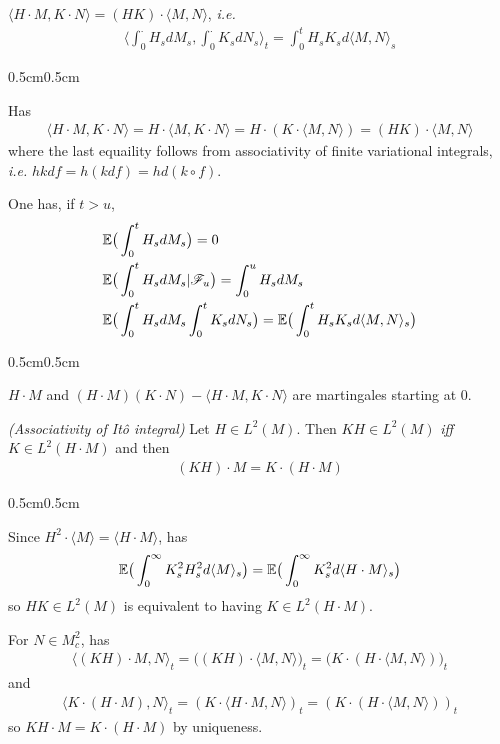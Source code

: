 \documentclass[12pt,a4paper]{article}
\newenvironment{proof}
{\begin{changemargin}{0.5cm}{0.5cm} 
	}%
	{\end{changemargin}
}
\newenvironment{p}
{\begin{proof} 
	}%
	{\end{proof}
}
\begin{document}
\corr $\langle H\cdot M, K\cdot N \rangle = (HK)\cdot \langle M, N \rangle$, \textit{i.e.}
\begin{align*}
\langle \int_0^{\cdot} H_s dM_s , \int_0^{\cdot} K_s dN_s \rangle_t = \int_0^t H_s K_s d\langle M, N \rangle_s 
\end{align*}
\begin{p}
\pf Has
\begin{align*}
\langle H\cdot M, K\cdot N \rangle = H \cdot \langle M, K \cdot N \rangle = H \cdot (K \cdot \langle M, N \rangle) = (HK) \cdot \langle M, N \rangle 
\end{align*}
where the last equaility follows from associativity of finite variational integrals, \textit{i.e.} $hk df = h(kdf) = h d(k \circ f)$.

\eop
\end{p}
\s

\corr One has, if $t>u$,
\begin{align*}
& \mathbb{E} \big( \int_0^t H_s dM_s \big) =0 \\
& \mathbb{E} \big( \int_0^t H_s dM_s | \mathscr{F}_u \big) = \int_0^u H_s dM_s \\
& \mathbb{E} \big( \int_0^t H_s dM_s \int_0^t K_s dN_s \big) = \mathbb{E} \big( \int_0^t H_s K_s d\langle M, N \rangle_s \big)
\end{align*} 
\begin{p}
\pf $H\cdot M$ and $(H\cdot M)(K \cdot N) - \langle H\cdot M, K \cdot N \rangle$ are martingales starting at 0.

\eop
\end{p}
\s

\corr \emph{(Associativity of It\^o integral)} Let $H\in L^2(M)$. Then $KH \in L^2(M)$ \emph{iff} $K \in L^2(H \cdot M)$ and then
\begin{align*}
(KH)\cdot M = K\cdot (H \cdot M)
\end{align*}
\begin{p}
\pf Since $H^2 \cdot \langle M \rangle = \langle H \cdot M \rangle$, has
\begin{align*}
\mathbb{E} \big( \int_0^{\infty} K_s^2 H_s^2 d\langle M \rangle_s \big) = \mathbb{E} \big( \int_0^{\infty} K_s^2 d\langle H \cdot M \rangle_s \big)
\end{align*}
so $HK \in L^2(M)$ is equivalent to having $K \in L^2(H \cdot M)$.

\quad For $N \in M_c^2$, has
\begin{align*}
\langle (KH) \cdot M, N \rangle_t = \big( (KH) \cdot \langle M, N \rangle \big)_t = \big(K \cdot(H \cdot \langle M, N \rangle )\big)_t
\end{align*}
and
\begin{align*}
\langle K \cdot (H \cdot M) , N \rangle_t = (K \cdot \langle H \cdot M, N \rangle)_t = (K \cdot (H \cdot \langle M, N \rangle))_t
\end{align*}
so $KH\cdot M = K\cdot (H\cdot M)$ by uniqueness.

\eop
\end{p}
\end{document}
